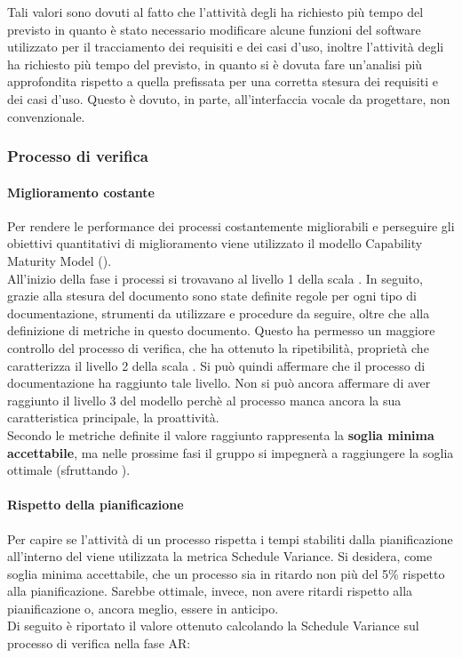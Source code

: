 \documentclass[PianoDiQualifica.tex]{subfiles}
\begin{document}
			Tali valori sono dovuti al fatto che l’attività degli \AMMP{} ha richiesto più tempo del previsto in quanto è stato necessario modificare alcune funzioni del software utilizzato per il tracciamento dei requisiti e dei casi
d’uso, inoltre l’attività degli \ANP{} ha richiesto più tempo del previsto, in quanto si è dovuta fare un’analisi più approfondita rispetto a quella prefissata per una corretta stesura dei requisiti e dei casi d’uso. Questo è dovuto, in parte, all’interfaccia vocale da progettare, non convenzionale.
			
				
		
	\subsubsection{Processo di verifica}
		\paragraph{Miglioramento costante}
				Per rendere le performance dei processi costantemente migliorabili e perseguire gli obiettivi quantitativi di miglioramento viene utilizzato il modello Capability Maturity Model ().\\
		All'inizio della fase i processi si trovavano al livello 1 della scala . In seguito, grazie alla stesura del documento \NPdocRR{}  sono state definite regole per ogni tipo di documentazione, strumenti da utilizzare e procedure da seguire, oltre che alla definizione di metriche in questo documento. Questo ha permesso un maggiore controllo del processo di verifica, che ha ottenuto la ripetibilità, proprietà che caratterizza il livello 2 della scala . Si può quindi affermare che il processo di documentazione ha raggiunto tale livello. Non si può ancora affermare di aver raggiunto il livello 3 del modello perchè al processo manca ancora la sua caratteristica principale, la proattività.\\
		Secondo le metriche definite il valore raggiunto rappresenta la \textbf{soglia minima accettabile}, ma nelle prossime fasi il gruppo si impegnerà a raggiungere la soglia ottimale (sfruttando ).
		\paragraph{Rispetto della pianificazione}
		Per capire se l'attività di un processo rispetta i tempi stabiliti dalla pianificazione all'interno del \PPdocRR{} viene utilizzata la metrica Schedule Variance.
			Si desidera, come soglia minima accettabile, che un processo sia in ritardo non più del 5\% rispetto alla pianificazione. Sarebbe ottimale, invece, non avere ritardi rispetto alla pianificazione o, ancora meglio, essere in anticipo.\\
			Di seguito è riportato il valore ottenuto calcolando la Schedule Variance sul processo di verifica nella fase AR:\\
			
\end{document}
